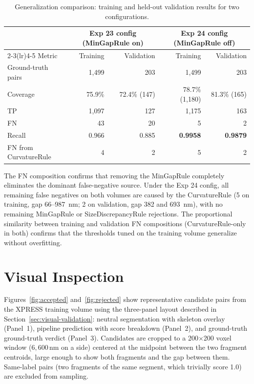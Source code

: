 \begin{table}[H]
\centering
\caption{Generalization comparison: training and held-out validation results for
two configurations.}
\label{tab:generalization}
\begin{tabular}{@{}lrrrr@{}}
\toprule
 & \multicolumn{2}{c}{Exp 23 config (MinGapRule on)} & \multicolumn{2}{c}{Exp 24 config (MinGapRule off)} \\
\cmidrule(lr){2-3}\cmidrule(lr){4-5}
Metric & Training & Validation & Training & Validation \\
\midrule
Ground-truth pairs & 1{,}499 & 203 & 1{,}499 & 203 \\
Coverage & 75.9\% & 72.4\% (147) & 78.7\% (1{,}180) & 81.3\% (165) \\
TP & 1{,}097 & 127 & 1{,}175 & 163 \\
FN & 43 & 20 & 5 & 2 \\
Recall & 0.966 & 0.885 & \textbf{0.9958} & \textbf{0.9879} \\
FN from CurvatureRule & 4 & 2 & 5 & 2 \\
\bottomrule
\end{tabular}
\end{table}

The FN composition confirms that removing the MinGapRule completely eliminates
the dominant false-negative source. Under the Exp 24 config, all remaining
false negatives on both volumes are caused by the CurvatureRule (5 on training,
gap 66--987~nm; 2 on validation, gap 382 and 693~nm), with no remaining
MinGapRule or SizeDiscrepancyRule rejections. The proportional similarity
between training and validation FN compositions (CurvatureRule-only in both)
confirms that the thresholds tuned on the training volume generalize without
overfitting.

\section{Visual Inspection}

Figures~\ref{fig:accepted} and~\ref{fig:rejected} show representative candidate
pairs from the XPRESS training volume using the three-panel layout described in
Section~\ref{sec:visual-validation}: neutral segmentation with skeleton overlay
(Panel~1), pipeline prediction with score breakdown (Panel~2), and ground-truth
ground-truth verdict (Panel~3).  Candidates are cropped to a 200$\times$200 voxel
window ($6{,}600\,\text{nm}$ on a side) centered at the midpoint between the two
fragment centroids, large enough to show both fragments and the gap between them.
Same-label pairs (two fragments of the same segment, which trivially score 1.0)
are excluded from sampling.

